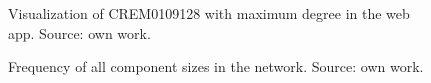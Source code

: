 \documentclass[pdftex,12pt,a4paper]{report}
\begin{document}
\begin{figure}[!ht]
\begin{center}
	\caption{Visualization of CREM0109128 with maximum degree in the web app. Source: own work.}
	\label{crem_max_degree}
\end{center}
\end{figure}

\begin{figure}[!ht]
\begin{center}
	\caption{Frequency of all component sizes in the network. Source: own work.}
	\label{comp_freq}
\end{center}
\end{figure}
\end{document}
